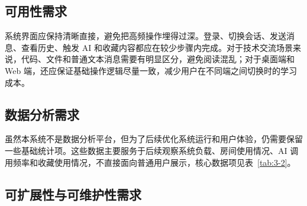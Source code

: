\subsection{可用性需求}

系统界面应保持清晰直接，避免把高频操作埋得过深。登录、切换会话、发送消息、查看历史、触发 AI 和收藏内容都应在较少步骤内完成。对于技术交流场景来说，代码、文件和普通文本消息需要有明显区分，避免阅读混乱；对于桌面端和 Web 端，还应保证基础操作逻辑尽量一致，减少用户在不同端之间切换时的学习成本。

\subsection{数据分析需求}

虽然本系统不是数据分析平台，但为了后续优化系统运行和用户体验，仍需要保留一些基础统计项。这些数据主要服务于后续观察系统负载、房间使用情况、AI 调用频率和收藏使用情况，不直接面向普通用户展示，核心数据项见表~\ref{tab:3-2}。

\begin{table}[!htbp]
\centering
\caption{系统数据分析核心数据项}
\label{tab:3-2}
\small
\renewcommand{\arraystretch}{1.25}
\setlength{\tabcolsep}{1ex}
\end{table}

\subsection{可扩展性与可维护性需求}

